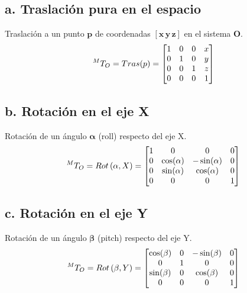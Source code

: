 \documentclass[a4paper,12pt]{article}
\begin{document}
\subsection{a. Traslación pura en el espacio}

Traslación a un punto $\mathbf{p}$ de coordenadas $\mathbf{\left[x\,y\,z\right]}$ en el sistema \textbf{O}.
\begin{equation*}
    \prescript{M}{}{T_O} = Tras(p) = 
    \begin{bmatrix}
        1 & 0 & 0 & x \\
        0 & 1 & 0 & y \\
        0 & 0 & 1 & z \\
        0 & 0 & 0 & 1
    \end{bmatrix}
\end{equation*}

\subsection{b. Rotación en el eje X}

Rotación de un ángulo $\mathbf{\alpha}$ (roll) respecto del eje X.
\begin{equation*}
    \prescript{M}{}{T_O} = Rot\left(\alpha, X\right) = 
    \begin{bmatrix}
        1 & 0            & 0             & 0 \\
        0 & \cos(\alpha) & -\sin(\alpha) & 0 \\
        0 & \sin(\alpha) & \cos(\alpha)  & 0 \\
        0 & 0            & 0             & 1
    \end{bmatrix}
\end{equation*}

\subsection{c. Rotación en el eje Y}

Rotación de un ángulo $\mathbf{\beta}$ (pitch) respecto del eje Y.
\begin{equation*}
    \prescript{M}{}{T_O} = Rot\left(\beta, Y\right) = 
    \begin{bmatrix}
        \cos(\beta) & 0            & -\sin(\beta)   & 0 \\
        0           & 1            & 0              & 0 \\
        \sin(\beta) & 0            & \cos(\beta)    & 0 \\
        0           & 0            & 0              & 1
    \end{bmatrix}
\end{equation*}
\end{document}
